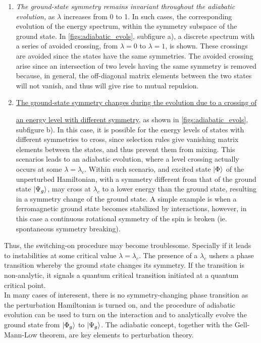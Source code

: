 \documentclass{homework}
\begin{document}
\begin{enumerate}
    \item \textit{The ground-state symmetry remains invariant throughout the adiabatic evolution, } as $\lambda$ increases from 0 to 1. In such cases, the corresponding evolution of the energy spectrum, within the symmetry subspace of the ground state. In \cref{figs:adiabatic_evols}, subfigure a), a discrete spectrum with a series of avoided crossing, from $\lambda = 0$ to $\lambda = 1$, is shown. These crossings are avoided since the states have the same symmetries. The avoided crossing arise since an intersection of two levels having the same symmetry is removed because, in general, the off-diagonal matrix elements between the two states will not vanish, and thus will give rise to mutual repulsion. 
    \item \underline{The ground-state symmetry changes during the evolution due to a crossing of}
    
    \underline{ an energy level with different symmetry}, as shown in \cref{figs:adiabatic_evols}, subfigure b). In this case, it is possible for the energy levels of states with different symmetries to cross, since selection rules give vanishing matrix elements between the states, and thus prevent them from mixing. This scenarios leads to an adiabatic evolution, where a level crossing actually occurs at some $\lambda = \lambda_c$. Within such scenario, and excited state $\ket{\Phi}$ of the unperturbed Hamiltonian, with a symmetry different from that of the ground state $\ket{\Psi_g}$, may cross at $\lambda_c$ to a lower energy than the ground state, resulting in a symmetry change of the ground state. A simple example is when a ferromagnetic ground state becomes stabilized by interactions, however, in this case a continuous rotational symmetry of the spin is broken (ie. spontaneous symmetry breaking).  \\ 
\end{enumerate}

Thus, the switching-on procedure may become troublesome. Specially if it leads to instabilities at some critical value $\lambda = \lambda_c$. The presence of a $\lambda_c$ ushers a phase transition whereby the ground state changes its symmetry. If the transition is non-analytic, it signals a quantum critical transition initiated at a quantum critical point. \\

In many cases of interesent, there is no symmetry-changing phase transition as the perturbation Hamiltonian is turned on, and the procedure of adiabatic evolution can be used to turn on the interaction and to analytically evolve the ground state from $\ket{\Phi_g}$ to $\ket{\Psi_g}$. The adiabatic concept, together with the Gell-Mann-Low theorem, are key elements to perturbation theory. \\
\end{document}
